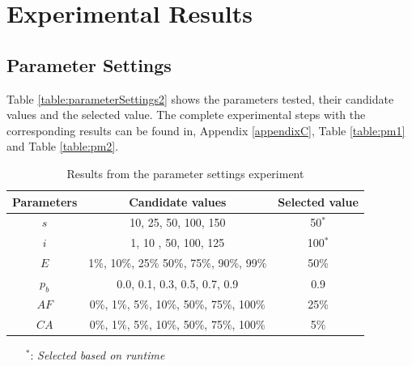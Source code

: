 \section{Experimental Results}
\label{sec:expResults}

\subsection{Parameter Settings}
\label{subsec:parameterSettings_results}

Table \vref{table:parameterSettings2} shows the parameters tested, their candidate values and the selected value. The complete experimental steps with the corresponding results can be found in, Appendix \ref{appendixC}, Table \vref{table:pm1} and Table \vref{table:pm2}. 
    \begin{table}[H]
    \centering
    \begin{tabular}{|c|c||c|}
    \hline
    Parameters & Candidate values & Selected value\\
    \hline
    $s$ & 10, 25, 50, 100, 150 & 50$^*$ \\
    $i$ & 1, 10 , 50, 100, 125 & 100$^*$ \\
    $E$ & 1\%, 10\%, 25\% 50\%, 75\%, 90\%, 99\% & 50\% \\
    $p_{b}$ & 0.0, 0.1, 0.3, 0.5, 0.7, 0.9 & 0.9 \\
    $AF$ & 0\%, 1\%, 5\%, 10\%, 50\%, 75\%, 100\% & 25\% \\
    $CA$ & 0\%, 1\%, 5\%, 10\%, 50\%, 75\%, 100\% & 5\% \\
    \hline
    \end{tabular}
    \caption {Results from the parameter settings experiment}
    \begin{itemize}[noitemsep]
    \item[$^*$:] \emph{\color{blue} Selected based on runtime}
    \end{itemize}
    \label{table:parameterSettings2}
    \end{table}

